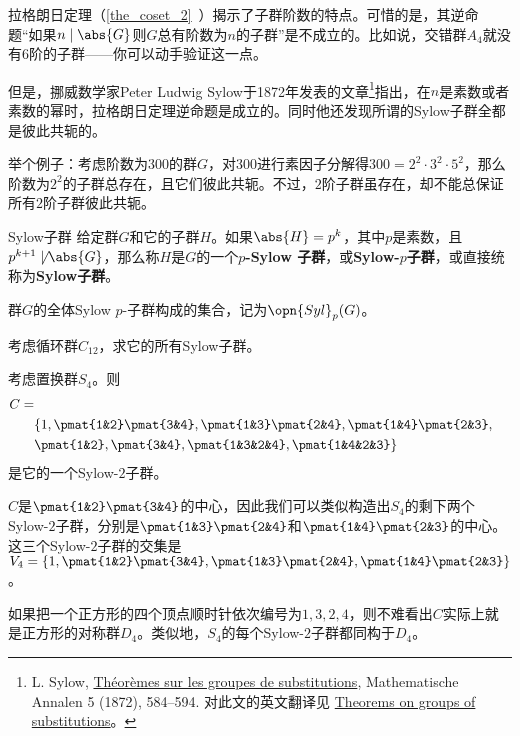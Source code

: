 

拉格朗日定理（\autoref{the_coset_2}~）揭示了子群阶数的特点。可惜的是，其逆命题“如果$n\mid \abs{G}$则$G$总有阶数为$n$的子群”是不成立的。比如说，交错群$A_4$就没有$6$阶的子群——你可以动手验证这一点。

但是，挪威数学家Peter Ludwig Sylow于1872年发表的文章\footnote{L. Sylow, \href{https://eudml.org/doc/156588}{Théorèmes sur les groupes de substitutions}, Mathematische Annalen 5 (1872), 584–594. 对此文的英文翻译见 \href{http://www.maths.qmul.ac.uk/~raw/pubs_files/Sylow.pdf}{Theorems on groups of substitutions}。}指出，在$n$是素数或者素数的幂时，拉格朗日定理逆命题是成立的。同时他还发现所谓的Sylow子群全都是彼此共轭的。

举个例子：考虑阶数为$300$的群$G$，对$300$进行素因子分解得$300=2^2\cdot 3^2\cdot 5^2$，那么阶数为$2^2$的子群总存在，且它们彼此共轭。不过，$2$阶子群虽存在，却不能总保证所有$2$阶子群彼此共轭。

\begin{definition}{Sylow子群}\label{def_Sylow_1}
给定群$G$和它的子群$H$。如果$\abs{H}=p^k$，其中$p$是素数，且$p^{k+1}\not\mid\abs{G}$，那么称$H$是$G$的一个$p$\textbf{-Sylow 子群}，或\textbf{Sylow-}$p$\textbf{子群}，或直接统称为\textbf{Sylow子群}。

群$G$的全体Sylow $p$-子群构成的集合，记为$\opn{Syl}_p(G)$。
\end{definition}

\begin{exercise}{}
考虑循环群$C_{12}$，求它的所有Sylow子群。
\end{exercise}

\begin{example}{}
考虑置换群$S_4$。则
\begin{equation}
\begin{aligned}
C=\\
&\{1, \pmat{1&2}\pmat{3&4}, \pmat{1&3}\pmat{2&4}, \pmat{1&4}\pmat{2&3},\\
& \pmat{1&2}, \pmat{3&4}, \pmat{1&3&2&4}, \pmat{1&4&2&3}\}
\end{aligned}~
\end{equation}
是它的一个Sylow-$2$子群。

$C$是$\pmat{1&2}\pmat{3&4}$的中心，因此我们可以类似构造出$S_4$的剩下两个Sylow-$2$子群，分别是$\pmat{1&3}\pmat{2&4}$和$\pmat{1&4}\pmat{2&3}$的中心。这三个Sylow-$2$子群的交集是$V_4=\{1, \pmat{1&2}\pmat{3&4}, \pmat{1&3}\pmat{2&4}, \pmat{1&4}\pmat{2&3}\}$。

如果把一个正方形的四个顶点顺时针依次编号为$1, 3, 2, 4$，则不难看出$C$实际上就是正方形的对称群$D_4$。类似地，$S_4$的每个Sylow-$2$子群都同构于$D_4$。

\end{example}

